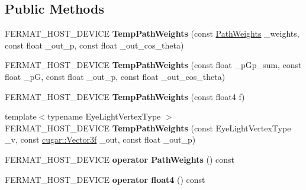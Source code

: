 \subsection*{Public Methods}
\begin{DoxyCompactItemize}
\item 
\mbox{\label{struct_temp_path_weights_a55788606cd767e45010356dcacf21373}} 
F\+E\+R\+M\+A\+T\+\_\+\+H\+O\+S\+T\+\_\+\+D\+E\+V\+I\+CE {\bfseries Temp\+Path\+Weights} (const \hyperlink{struct_path_weights}{Path\+Weights} \+\_\+weights, const float \+\_\+out\+\_\+p, const float \+\_\+out\+\_\+cos\+\_\+theta)
\item 
\mbox{\label{struct_temp_path_weights_a25913576f9e91f90b8d466a98834617c}} 
F\+E\+R\+M\+A\+T\+\_\+\+H\+O\+S\+T\+\_\+\+D\+E\+V\+I\+CE {\bfseries Temp\+Path\+Weights} (const float \+\_\+p\+Gp\+\_\+sum, const float \+\_\+pG, const float \+\_\+out\+\_\+p, const float \+\_\+out\+\_\+cos\+\_\+theta)
\item 
\mbox{\label{struct_temp_path_weights_aead3a9feef123d9ef4bb3f6f818541e5}} 
F\+E\+R\+M\+A\+T\+\_\+\+H\+O\+S\+T\+\_\+\+D\+E\+V\+I\+CE {\bfseries Temp\+Path\+Weights} (const float4 f)
\item 
\mbox{\label{struct_temp_path_weights_ac6ccc2514bc829cc80cdcdb4218f034d}} 
{\footnotesize template$<$typename Eye\+Light\+Vertex\+Type $>$ }\\F\+E\+R\+M\+A\+T\+\_\+\+H\+O\+S\+T\+\_\+\+D\+E\+V\+I\+CE {\bfseries Temp\+Path\+Weights} (const Eye\+Light\+Vertex\+Type \+\_\+v, const \hyperlink{structcugar_1_1_vector}{cugar\+::\+Vector3f} \+\_\+out, const float \+\_\+out\+\_\+p)
\item 
\mbox{\label{struct_temp_path_weights_ac3263560f870db89c14779ad6c021798}} 
F\+E\+R\+M\+A\+T\+\_\+\+H\+O\+S\+T\+\_\+\+D\+E\+V\+I\+CE {\bfseries operator Path\+Weights} () const
\item 
\mbox{\label{struct_temp_path_weights_a8adc8b080395236c5201b68155056a5c}} 
F\+E\+R\+M\+A\+T\+\_\+\+H\+O\+S\+T\+\_\+\+D\+E\+V\+I\+CE {\bfseries operator float4} () const
\end{DoxyCompactItemize}
